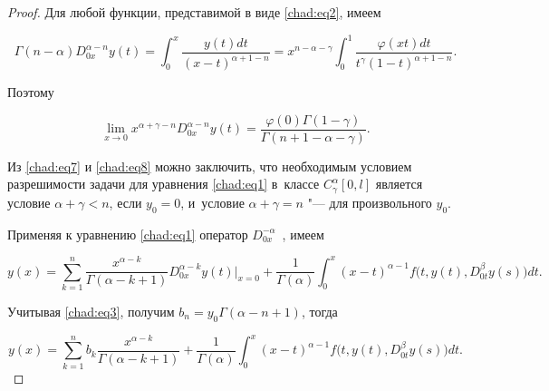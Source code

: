 \begin{proof}

Для любой функции,  представимой в виде \eqref{chad:eq2},  имеем

\begin{equation}

\label{chad:eq7}

\Gamma (n-\alpha)D_{0x}^{\alpha-n}y(t)\!=\!\int_0^x \frac{y(t)dt}{(x-t)^{\alpha+1-n}}=

x^{n-\alpha-\gamma}\int_0^1 \frac{\varphi(xt)dt}{t^\gamma(1-t)^{\alpha+1-n}}.

\end{equation}  

Поэтому

\begin{equation}

\label{chad:eq8}

\lim_{x \to 0} x^{\alpha+\gamma-n}D_{0x}^{\alpha-n}y(t)=\frac{\varphi(0)\Gamma(1-\gamma)}{\Gamma(n+1-\alpha-\gamma)}.

\end{equation}  

Из \eqref{chad:eq7} и \eqref{chad:eq8} можно заключить,  что необходимым условием разрешимости задачи для уравнения \eqref{chad:eq1} в~классе  $C_\gamma^\alpha[0, l]$ является условие $\alpha+\gamma<n$,   если $y_0=0$,  и~условие  $\alpha+\gamma=n$ "--- для произвольного $y_0$.



Применяя к уравнению \eqref{chad:eq1} оператор $D_{0x}^{-\alpha}$~{\rm\cite{chadaev:3}},  имеем

\begin{equation*}


y(x)=\sum_{k=1}^n \frac{x^{\alpha-k}}{\Gamma(\alpha-k+1)}D_{0x}^{\alpha-k}y(t)\Bigr|_{x=0}+\frac{ 1}{\Gamma(\alpha)}\int_0^x(x-t)^{\alpha-1}f\bigl(t, y(t), D_{0t}^\beta y(s)\bigr)dt.

\end{equation*}  

Учитывая \eqref{chad:eq3},  получим $b_n=y_0\Gamma(\alpha-n+1)$,  тогда

\begin{equation}

\label{chad:eq10}

y(x)=\sum_{k=1}^n b_k\frac{x^{\alpha-k}}{\Gamma(\alpha-k+1)}+\frac{1}{\Gamma(\alpha)}\int_0^x(x-t)^{\alpha-1}f\bigl(t, y(t), D_{0t}^\beta y(s)\bigr)dt.


\end{equation}
\end{proof}
